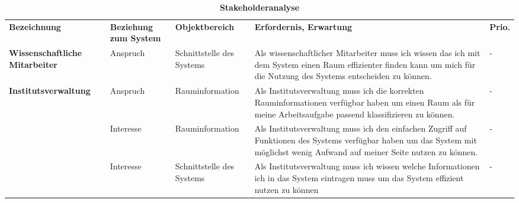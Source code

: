 \begin{table}
	
 	\caption{\textbf{Stakeholderanalyse}}
 	\begin{tabularx}{\textwidth}{|X|X|X|X|m{}|}			
 		\rowcolor{heading}\textbf{Bezeichnung} & \textbf{Beziehung zum System} & \textbf{Objektbereich} & \textbf{Erfordernis, Erwartung} & \textbf{Prio.}\\
			 
 	\textbf{Wissenschaftliche Mitarbeiter} & Anspruch & Schnittstelle des Systems & Als wissenschaftlicher Mitarbeiter muss ich wissen das ich mit dem System einen Raum effizienter finden kann um mich für die Nutzung des Systems entscheiden zu können. & -\\
\rowcolor{odd} \textbf{Institutsverwaltung} & Anspruch & Rauminformation & Als Institutsverwaltung muss ich die korrekten Rauminformationen verfügbar haben um einen Raum als für meine Arbeitsaufgabe passend klassifizieren zu können. & -\\
	& Interesse & Rauminformation & Als Institutsverwaltung muss ich den einfachen Zugriff auf Funktionen des Systems verfügbar haben um das System mit möglichst wenig Aufwand auf meiner Seite nutzen zu können. & -\\
\rowcolor{odd} & Interesse & Schnittstelle des Systems & Als Institutsverwaltung muss ich wissen welche Informationen ich in das System eintragen muss um das System effizient nutzen zu können & -\\ \hline
 	\end{tabularx}
 	
\end{table}

